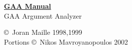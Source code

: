 \documentclass{book}
\begin{document}
\begin{center}
{\bf \underline{GAA Manual}}\\
GAA Argument Analyzer 


\copyright\ Joran Maille 1998,1999\\
Portions \copyright\ Nikos Mavroyanopoulos 2002
\end{center}

\tableofcontents



\end{document}
